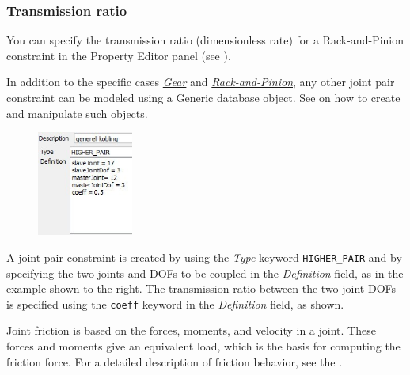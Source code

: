 \subsubsection{Transmission ratio}

\begin{minipage}{\textwidth}
You can specify the transmission ratio (dimensionless rate) for a
Rack-and-Pinion constraint in the Property Editor panel
(see ).
\end{minipage}

\clearpage
{}

In addition to the specific cases
\protect\hyperlink{gear}{\sl Gear} and
\protect\hyperlink{rack-and-pinion}{\sl Rack-and-Pinion},
any other joint pair constraint can be modeled using a Generic database object.
See 
on how to create and manipulate such objects.

\begin{figure}
  \vspace{-8mm}
  \includegraphics[width=0.28\textwidth]{Figures/4-gen-joint-pair-constr}
\end{figure}

A joint pair constraint is created by using the {\sl Type} keyword
{\tt HIGHER\_PAIR} and by specifying the two joints and DOFs to be coupled
in the {\sl Definition} field, as in the example shown to the right.
The transmission ratio between the two joint DOFs is specified using the
{\tt coeff} keyword in the {\sl Definition} field, as shown.




Joint friction is based on the forces, moments, and velocity in a joint.
These forces and moments give an equivalent load,
which is the basis for computing the friction force.
For a detailed description of friction behavior,
see the .

